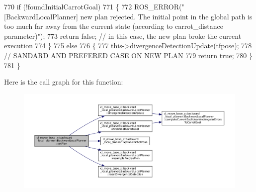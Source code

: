 \begin{DoxyCode}
770             \textcolor{keywordflow}{if} (!foundInitialCarrotGoal)
771             \{
772                 ROS\_ERROR(\textcolor{stringliteral}{"[BackwardLocalPlanner] new plan rejected. The initial point in the global path
       is too much far away from the current state (according to carrot\_distance parameter)"});
773                 \textcolor{keywordflow}{return} \textcolor{keyword}{false}; \textcolor{comment}{// in this case, the new plan broke the current execution}
774             \}
775             \textcolor{keywordflow}{else}
776             \{
777                 this->\hyperlink{classcl__move__base__z_1_1backward__local__planner_1_1BackwardLocalPlanner_ab1b01ecdb27641dde60661362d75465b}{divergenceDetectionUpdate}(tfpose);
778                 \textcolor{comment}{// SANDARD AND PREFERED CASE ON NEW PLAN}
779                 \textcolor{keywordflow}{return} \textcolor{keyword}{true};
780             \}
781         \}
\end{DoxyCode}
Here is the call graph for this function\+:
\nopagebreak
\begin{figure}[H]
\begin{center}
\leavevmode
\includegraphics[width=350pt]{classcl__move__base__z_1_1backward__local__planner_1_1BackwardLocalPlanner_ab11a0eec45f24b5a5a3987a50427eed4_cgraph}
\end{center}
\end{figure}
\mbox{\label{classcl__move__base__z_1_1backward__local__planner_1_1BackwardLocalPlanner_a16e79a1b4c0f18879f6f0a8ba67103fd}} 
